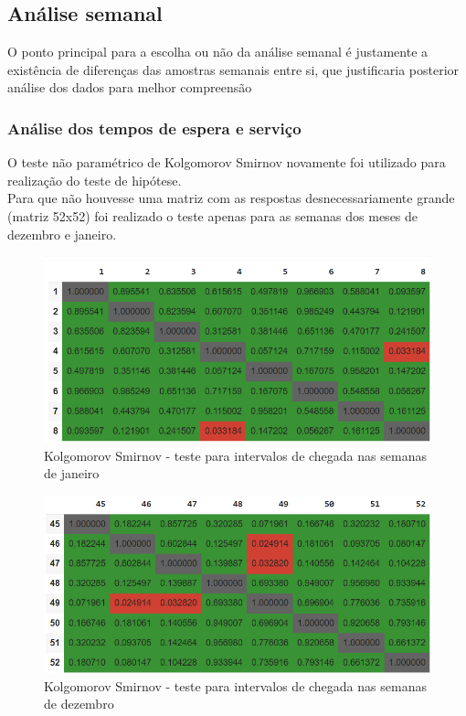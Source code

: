 \subsection{Análise semanal}
O ponto principal para a escolha ou não da análise semanal é justamente a existência de diferenças das amostras semanais entre si, que justificaria posterior análise dos dados para melhor compreensão\\
\subsubsection{Análise dos tempos de espera e serviço}
O teste não paramétrico de Kolgomorov Smirnov novamente foi utilizado para realização do teste de hipótese.\\
Para que não houvesse uma matriz com as respostas desnecessariamente grande (matriz 52x52) foi realizado o teste apenas para as semanas dos meses de dezembro e janeiro.\\
\begin{center}
    \begin{figure}[H]
        \includegraphics{analise-de-dados/semanal/janas.png}
        \caption{Kolgomorov Smirnov - teste para intervalos de chegada nas semanas de janeiro}
        \label{fig: jan_as_img}
    \end{figure}
    \begin{figure}[H]
        \includegraphics{analise-de-dados/semanal/dezas.png}
        \caption{Kolgomorov Smirnov - teste para intervalos de chegada nas semanas de dezembro}
        \label{fig: dez_as_img}
    \end{figure}
\end{center}
